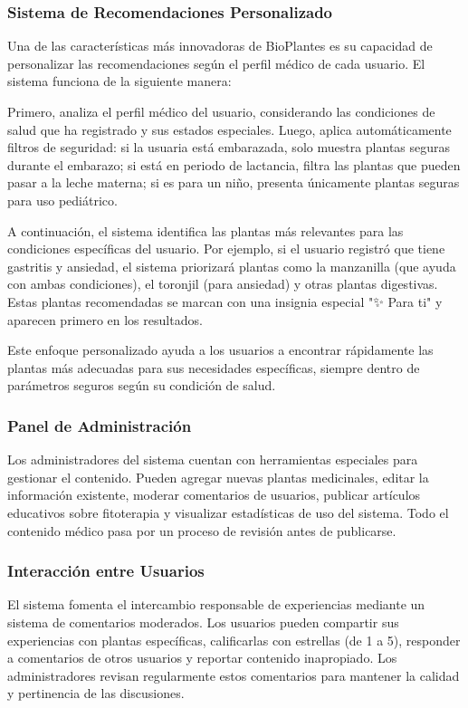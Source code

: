 \documentclass[12pt,a4paper]{article}
\begin{document}
\subsubsection{Sistema de Recomendaciones Personalizado}

Una de las características más innovadoras de BioPlantes es su capacidad de personalizar las recomendaciones según el perfil médico de cada usuario. El sistema funciona de la siguiente manera:

Primero, analiza el perfil médico del usuario, considerando las condiciones de salud que ha registrado y sus estados especiales. Luego, aplica automáticamente filtros de seguridad: si la usuaria está embarazada, solo muestra plantas seguras durante el embarazo; si está en periodo de lactancia, filtra las plantas que pueden pasar a la leche materna; si es para un niño, presenta únicamente plantas seguras para uso pediátrico.

A continuación, el sistema identifica las plantas más relevantes para las condiciones específicas del usuario. Por ejemplo, si el usuario registró que tiene gastritis y ansiedad, el sistema priorizará plantas como la manzanilla (que ayuda con ambas condiciones), el toronjil (para ansiedad) y otras plantas digestivas. Estas plantas recomendadas se marcan con una insignia especial "✨ Para ti" y aparecen primero en los resultados.

Este enfoque personalizado ayuda a los usuarios a encontrar rápidamente las plantas más adecuadas para sus necesidades específicas, siempre dentro de parámetros seguros según su condición de salud.

\subsubsection{Panel de Administración}

Los administradores del sistema cuentan con herramientas especiales para gestionar el contenido. Pueden agregar nuevas plantas medicinales, editar la información existente, moderar comentarios de usuarios, publicar artículos educativos sobre fitoterapia y visualizar estadísticas de uso del sistema. Todo el contenido médico pasa por un proceso de revisión antes de publicarse.

\subsubsection{Interacción entre Usuarios}

El sistema fomenta el intercambio responsable de experiencias mediante un sistema de comentarios moderados. Los usuarios pueden compartir sus experiencias con plantas específicas, calificarlas con estrellas (de 1 a 5), responder a comentarios de otros usuarios y reportar contenido inapropiado. Los administradores revisan regularmente estos comentarios para mantener la calidad y pertinencia de las discusiones.
\end{document}
